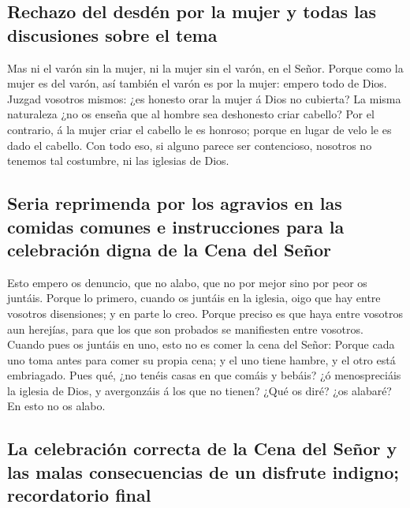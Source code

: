 \hypertarget{rechazo-del-desduxe9n-por-la-mujer-y-todas-las-discusiones-sobre-el-tema}{%
\subsection{Rechazo del desdén por la mujer y todas las discusiones
sobre el
tema}\label{rechazo-del-desduxe9n-por-la-mujer-y-todas-las-discusiones-sobre-el-tema}}

 Mas ni el varón sin la mujer, ni la mujer sin el varón, en
el Señor.  Porque como la mujer es del varón, así también
el varón es por la mujer: empero todo de Dios.  Juzgad
vosotros mismos: ¿es honesto orar la mujer á Dios no cubierta?
 La misma naturaleza ¿no os enseña que al hombre sea
deshonesto criar cabello?  Por el contrario, á la mujer
criar el cabello le es honroso; porque en lugar de velo le es dado el
cabello.  Con todo eso, si alguno parece ser contencioso,
nosotros no tenemos tal costumbre, ni las iglesias de Dios.

\hypertarget{seria-reprimenda-por-los-agravios-en-las-comidas-comunes-e-instrucciones-para-la-celebraciuxf3n-digna-de-la-cena-del-seuxf1or}{%
\subsection{Seria reprimenda por los agravios en las comidas comunes e
instrucciones para la celebración digna de la Cena del
Señor}\label{seria-reprimenda-por-los-agravios-en-las-comidas-comunes-e-instrucciones-para-la-celebraciuxf3n-digna-de-la-cena-del-seuxf1or}}

 Esto empero os denuncio, que no alabo, que no por mejor
sino por peor os juntáis.  Porque lo primero, cuando os
juntáis en la iglesia, oigo que hay entre vosotros disensiones; y en
parte lo creo.  Porque preciso es que haya entre vosotros
aun herejías, para que los que son probados se manifiesten entre
vosotros.  Cuando pues os juntáis en uno, esto no es comer
la cena del Señor:  Porque cada uno toma antes para comer
su propia cena; y el uno tiene hambre, y el otro está embriagado.
 Pues qué, ¿no tenéis casas en que comáis y bebáis? ¿ó
menospreciáis la iglesia de Dios, y avergonzáis á los que no tienen?
¿Qué os diré? ¿os alabaré? En esto no os alabo.

\hypertarget{la-celebraciuxf3n-correcta-de-la-cena-del-seuxf1or-y-las-malas-consecuencias-de-un-disfrute-indigno-recordatorio-final}{%
\subsection{La celebración correcta de la Cena del Señor y las malas
consecuencias de un disfrute indigno; recordatorio
final}\label{la-celebraciuxf3n-correcta-de-la-cena-del-seuxf1or-y-las-malas-consecuencias-de-un-disfrute-indigno-recordatorio-final}}

